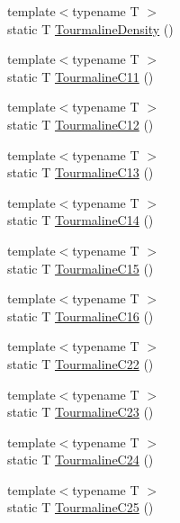 \begin{DoxyCompactItemize}
\item 
{\footnotesize template$<$typename T $>$ }\\static T \mbox{\hyperlink{namespacempc_1_1data_a86d92b2c9b6022616b964ae0226f4048}{Tourmaline\+Density}} ()
\item 
{\footnotesize template$<$typename T $>$ }\\static T \mbox{\hyperlink{namespacempc_1_1data_a7912ed22f7cc1f5526cf2844a78051d6}{Tourmaline\+C11}} ()
\item 
{\footnotesize template$<$typename T $>$ }\\static T \mbox{\hyperlink{namespacempc_1_1data_aa3e3d8143e854e6265bc535bb310ce70}{Tourmaline\+C12}} ()
\item 
{\footnotesize template$<$typename T $>$ }\\static T \mbox{\hyperlink{namespacempc_1_1data_a00b038ad8ce6e6d0f139baf3189d8881}{Tourmaline\+C13}} ()
\item 
{\footnotesize template$<$typename T $>$ }\\static T \mbox{\hyperlink{namespacempc_1_1data_a11760cce08732afa65cf2f8b25c2fb6a}{Tourmaline\+C14}} ()
\item 
{\footnotesize template$<$typename T $>$ }\\static T \mbox{\hyperlink{namespacempc_1_1data_a9077e4ae256bd0a3fe0f571929154bd3}{Tourmaline\+C15}} ()
\item 
{\footnotesize template$<$typename T $>$ }\\static T \mbox{\hyperlink{namespacempc_1_1data_a684e995cd6bc4ea2a3a0e09f4e38a583}{Tourmaline\+C16}} ()
\item 
{\footnotesize template$<$typename T $>$ }\\static T \mbox{\hyperlink{namespacempc_1_1data_a8ec17ca33494126264ce4ceca7003ce2}{Tourmaline\+C22}} ()
\item 
{\footnotesize template$<$typename T $>$ }\\static T \mbox{\hyperlink{namespacempc_1_1data_a938050181485b3a2a7cef76b41d434cd}{Tourmaline\+C23}} ()
\item 
{\footnotesize template$<$typename T $>$ }\\static T \mbox{\hyperlink{namespacempc_1_1data_ae46c1521d3c64f4539d09ec503d15f98}{Tourmaline\+C24}} ()
\item 
{\footnotesize template$<$typename T $>$ }\\static T \mbox{\hyperlink{namespacempc_1_1data_a9fd2e712789e7197200e90b756587403}{Tourmaline\+C25}} ()
\item 

\end{DoxyCompactItemize}
